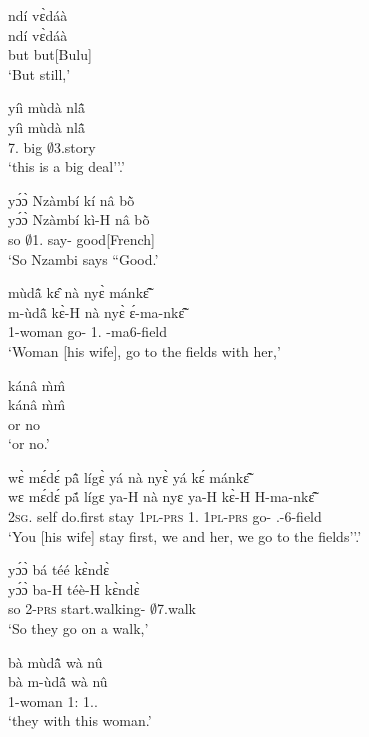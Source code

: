 \begin{exe}[(N234)]
\exN\label{n48} 
  \glll  ndí vɛ̀dáà \\
         ndí vɛ̀dáà \\
          but but[Bulu]  \\
    \trans `But still,'
 
\exN\label{n49} 
  \glll  yíì mùdà nlã̂ \\
        yíì mùdà nlã̂ \\
          7.{\COP} big $\emptyset$3.story \\
    \trans `this is a big deal''.'
 
\exN\label{n50}
  \glll yɔ́ɔ̀ Nzàmbí kí nâ bõ̀  \\
        yɔ́ɔ̀ Nzàmbí kì-H nâ bõ̀  \\
          so $\emptyset$1.{\PN} say-{\R} {\COMP} good[French] \\
    \trans `So Nzambi says ``Good.'
 
\exN\label{n51}
  \glll mùdã̂ kɛ̂ nà nyɛ̀ mánkɛ̃̂ \\
       m-ùdã̂ kɛ̀-H nà nyɛ̀ ɛ́-ma-nkɛ̃̂ \\
         {\N}1-woman go-{\R} {\COM} 1.{\OBJ} {\LOC}-ma6-field  \\
    \trans `Woman [his wife], go to the fields with her,'
 
\exN\label{n52}
  \glll kánâ m̀m̂ \\
      kánâ m̀m̂  \\
         or no   \\
    \trans `or no.'
 
\exN\label{n53}
  \glll   wɛ̀ mɛ́dɛ́ pã̂ lígɛ̀ yá nà nyɛ̀ yá kɛ́ mánkɛ̃̂\\
         wɛ mɛ́dɛ́ pã́ lígɛ ya-H nà nyɛ ya-H kɛ̀-H H-ma-nkɛ̃̂\\
           2\textsc{sg}.{\SBJ}  self do.first stay 1\textsc{pl}-\textsc{prs} {\COM} 1.{\OBJ}  1\textsc{pl}-\textsc{prs} go-{\R} {\OBJ}.{\LINK}-6-field\\
    \trans `You [his wife] stay first, we and her, we go to the fields''.'
 
\exN\label{n54} 
  \glll yɔ́ɔ̀ bá téé kɛ̀ndɛ̀ \\
        yɔ́ɔ̀ ba-H téè-H kɛ̀ndɛ̀ \\
         so 2-\textsc{prs} start.walking-{\R} $\emptyset$7.walk   \\
    \trans `So they go on a walk,'
 
\exN\label{n55}
  \glll bà mùdã̂ wà nû \\
       bà m-ùdã̂ wà nû \\
          {\AP} {\N}1-woman 1:{\ATT}  1.{\DEM}.{\PROX}  \\
    \trans `they with this woman.'
 

\end{exe}
